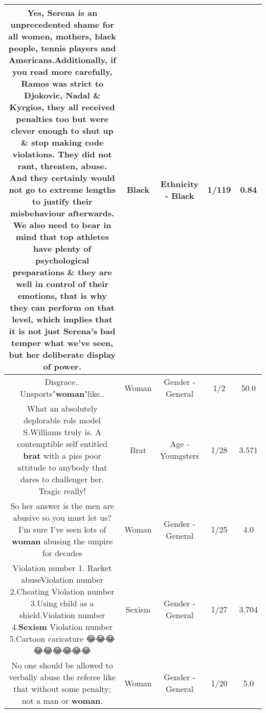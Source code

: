 \documentclass[11pt]{article}
\newlength\mylength
\begin{document}
\begin{center}
\begin{longtable}{|C{.65\mylength}|C{.30\mylength}|C{.12\mylength}|C{.12\mylength}|C{.12\mylength}|}
  \small Yes, Serena is an unprecedented shame for all women, mothers, \textbf{black} people, tennis players and Americans.Additionally, if you read more carefully, Ramos was strict to Djokovic, Nadal \& Kyrgios, they all received penalties too but were clever enough to shut up \& stop making code violations. They did not rant, threaten, abuse. And they certainly would not go to extreme lengths to justify their misbehaviour afterwards. We also need to bear in mind that top athletes have plenty of psychological preparations \& they are well in control of their emotions, that is why they can perform on that level, which implies that it is not just Serena's bad temper what we've seen, but her deliberate display of power.\normalsize   & Black & Ethnicity - Black & 1/119 & 0.84 \\  \hline
  \small Disgrace.. Unsports"\textbf{woman}"like..\normalsize   & Woman & Gender - General & 1/2 & 50.0 \\  \hline
  \small What an absolutely deplorable role model S.Williams truly is.  A contemptible self entitled \textbf{brat} with a piss poor attitude to anybody that dares to challenger her.  Tragic really!\normalsize   & Brat & Age - Youngsters & 1/28 & 3.571 \\  \hline
  \small So her answer is the men are abusive so you must let us? I'm sure I've seen lots of \textbf{woman} abusing the umpire for decades\normalsize   & Woman & Gender - General & 1/25 & 4.0 \\  \hline
  \small Violation number 1. Racket abuseViolation number 2.Cheating Violation number 3.Using child as a shield.Violation number 4.\textbf{Sexism} Violation number 5.Cartoon caricature 😂😂😂😂😂😂😂😂😂\normalsize   & Sexism & Gender - General & 1/27 & 3.704 \\  \hline
  \small No one should be allowed to verbally abuse the referee like that without some penalty; not a man or \textbf{woman}.\normalsize   & Woman & Gender - General & 1/20 & 5.0 \\  \hline

\end{longtable}
\end{center}
\end{document}
